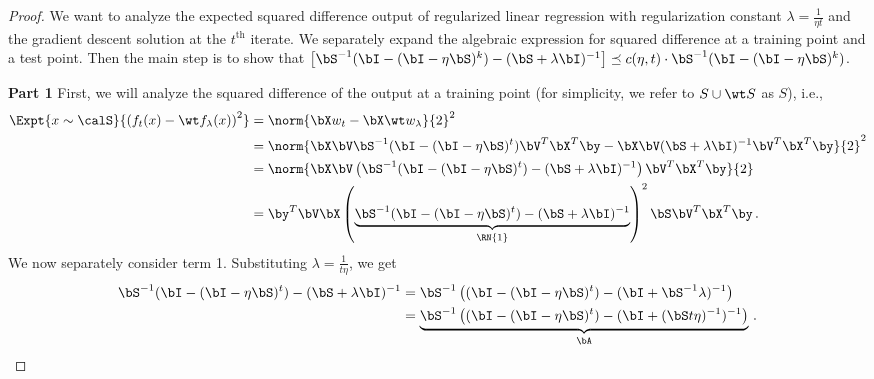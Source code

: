 \begin{proof}
    We want to analyze the expected squared difference output 
    of regularized linear regression 
    with regularization constant $\lambda = \frac{1}{\eta t}$ 
    and the gradient descent solution at the $t^\text{th}$ iterate. 
    We separately expand the algebraic expression 
    for squared difference at a training point and a test point. 
    Then the main step is to show that 
    $\left[ \bS ^{-1} ( \bI - (\bI - \eta \bS)^k )  - (\bS + \lambda \bI )^{-1}\right] \preceq c(\eta, t) \cdot \bS ^{-1} ( \bI - (\bI - \eta \bS)^k ) $.

    
   \textbf{Part 1 {} {}} 
    First, we will analyze the squared difference 
    of the output at a training point 
    (for simplicity, we refer to $S \cup \wt S$ as $S$), i.e., 
    \begin{align}
        \Expt{ x \sim \calS }{\left(f_t(x) - \wt f_\lambda (x)\right)^2} &= \norm{\bX w_t - \bX \wt w_\lambda}{2}^2\\ &=   \norm{\bX \bV \bS ^{-1} ( \bI - (\bI - \eta \bS)^t ) \bV^T \bX^T \by - \bX \bV (\bS + \lambda \bI )^{-1} \bV^T \bX^T \by }{2}^2 \\
        &= \norm{\bX \bV \left(\bS ^{-1} ( \bI - (\bI - \eta \bS)^t ) - (\bS + \lambda \bI )^{-1} \right) \bV^T \bX^T \by  }{2} \\
        &=  \by^T \bV \bX \left( \underbrace{\bS ^{-1} ( \bI - (\bI - \eta \bS)^t ) - (\bS + \lambda \bI )^{-1}}_{\RN{1}} \right)^2 \bS \bV^T \bX^T \by \label{eq:train_GD_rel} \,.
    \end{align}
    We now separately consider term 1. 
    Substituting $\lambda = \frac{1}{t \eta}$, 
    we get
    \begin{align}
        \bS ^{-1} ( \bI - (\bI - \eta \bS)^t ) - (\bS + \lambda \bI )^{-1} &= \bS^{-1} \left( ( \bI - (\bI - \eta \bS)^t ) - (\bI + \bS^{-1} \lambda )^{-1}\right) \\
        &= \underbrace{\bS^{-1} \left( ( \bI - (\bI - \eta \bS)^t ) - (\bI + ( \bS t \eta)^{-1}  )^{-1}\right)}_{\bA} \,.
    \end{align}


\end{proof}
